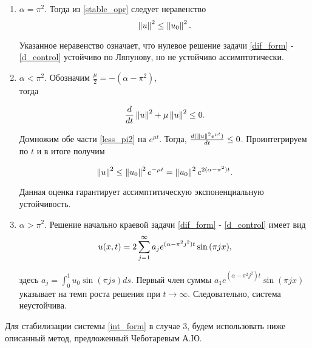 \begin{enumerate}
    \item $\alpha = \pi^2$. Тогда из \eqref{stable_opr} следует неравенство
        \begin{equation}
            \left\lVert u\right\rVert^2 \le \left\lVert u_0\right\rVert^2.
        \end{equation}

        Указанное неравенство означает, что нулевое решение задачи
        \eqref{dif_form} - \eqref{d_control} устойчиво по Ляпунову, но не 
        устойчиво ассимптотически.

    \item $\alpha < \pi^2$. Обозначим $\frac{\mu}{2} = -(\alpha - \pi^2)$,\\

        тогда

        \begin{equation}\label{less_pi2}
            \frac{d}{dt}\left\lVert u\right\rVert^2 + \mu \left\lVert u\right\rVert^2 \le 0.
        \end{equation}

        Домножим обе части \eqref{less_pi2} на $e^{\mu t}$. Тогда, 
        $\frac{d(\left\lVert u\right\rVert^2 e^{\mu t})}{dt} \le 0$. Проинтегрируем по $t$ и в 
        итоге получим

        \begin{equation*}
            \left\lVert u\right\rVert^2 \le \left\lVert u_0\right\rVert^2 e^{-\mu t} = \left\lVert u_0\right\rVert^2 e^{2(\alpha -
            \pi^2) t}.
        \end{equation*}

        Данная оценка гарантирует ассимптитическую экспоненциальную устойчивость.

    \item $\alpha > \pi^2$. Решение начально краевой задачи 
        \eqref{dif_form} - \eqref{d_control} имеет вид
        \begin{equation}
            u(x, t) = 2 \sum \limits_{j=1}^{\infty}{a_j e^{(\alpha - \pi^2 j^2)t}\sin{(\pi j x)}},
        \end{equation}

        здесь $a_j = \int_0^1{u_0 \sin{(\pi j s)} ds}$. Первый член суммы 
        $a_1e^{(\alpha - \pi^2j^2)t}\sin(\pi j x)$ указывает на темп роста 
        решения при $t \rightarrow \infty$. Следовательно, система неустойчива.
\end{enumerate}

Для стабилизации системы \eqref{int_form} в случае 3, будем использовать ниже 
описанный метод, предложенный Чеботаревым А.Ю. \cite{ChebotarevMGT}
